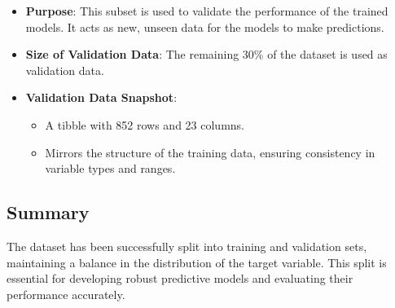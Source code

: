 \documentclass[
]{article}
\newenvironment{Shaded}{\begin{snugshade}}{\end{snugshade}}
\newcommand{\AttributeTok}[1]{\textcolor[rgb]{0.13,0.29,0.53}{#1}}
\newcommand{\CommentTok}[1]{\textcolor[rgb]{0.56,0.35,0.01}{\textit{#1}}}
\newcommand{\ConstantTok}[1]{\textcolor[rgb]{0.56,0.35,0.01}{#1}}
\newcommand{\DecValTok}[1]{\textcolor[rgb]{0.00,0.00,0.81}{#1}}
\newcommand{\FloatTok}[1]{\textcolor[rgb]{0.00,0.00,0.81}{#1}}
\newcommand{\FunctionTok}[1]{\textcolor[rgb]{0.13,0.29,0.53}{\textbf{#1}}}
\newcommand{\NormalTok}[1]{#1}
\newcommand{\OtherTok}[1]{\textcolor[rgb]{0.56,0.35,0.01}{#1}}
\newcommand{\SpecialCharTok}[1]{\textcolor[rgb]{0.81,0.36,0.00}{\textbf{#1}}}
\providecommand{\tightlist}{%
  \setlength{\itemsep}{0pt}\setlength{\parskip}{0pt}}
\begin{document}
\begin{itemize}
\tightlist
\item
  \textbf{Purpose}: This subset is used to validate the performance of
  the trained models. It acts as new, unseen data for the models to make
  predictions.
\item
  \textbf{Size of Validation Data}: The remaining 30\% of the dataset is
  used as validation data.
\item
  \textbf{Validation Data Snapshot}:

  \begin{itemize}
  \tightlist
  \item
    A tibble with 852 rows and 23 columns.
  \item
    Mirrors the structure of the training data, ensuring consistency in
    variable types and ranges.
  \end{itemize}
\end{itemize}

\hypertarget{summary}{%
\subsection{Summary}\label{summary}}

The dataset has been successfully split into training and validation
sets, maintaining a balance in the distribution of the target variable.
This split is essential for developing robust predictive models and
evaluating their performance accurately.

\begin{Shaded}
\end{Shaded}
\end{document}
